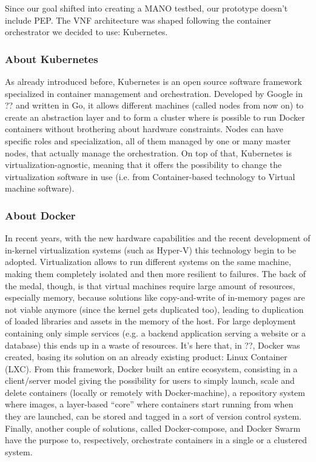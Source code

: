 \documentclass[10pt]{book}
\begin{document}
Since our goal shifted into creating a MANO testbed, our prototype doesn't
include PEP. The VNF architecture was shaped following the container
orchestrator we decided to use: Kubernetes.

\subsubsection{About Kubernetes}

As already introduced before, Kubernetes is an open source software framework
specialized in container management and orchestration. Developed by Google in
?? and written in Go, it allows different
machines (called nodes from now on) to create an abstraction layer and to form
a cluster where is possible to run Docker containers without brothering about
hardware constraints. Nodes can have specific roles and specialization, all of
them managed by one or many master nodes, that actually manage the
orchestration.
On top of that, Kubernetes is virtualization-agnostic, meaning that it offers
the possibility to change the virtualization software in use (i.e. from
Container-based technology to Virtual machine software).

\subsubsection{About Docker}

In recent years, with the new hardware capabilities and the recent development
of in-kernel virtualization systems (such as Hyper-V) this technology
begin to be adopted. Virtualization allows to run different systems on the
same machine, making them completely isolated and then more resilient to
failures. The back of the medal, though, is that virtual machines require large
amount of resources, especially memory, because solutions like copy-and-write
of in-memory pages are not viable anymore (since the kernel gets duplicated
too), leading to duplication of loaded libraries and assets in the memory of
the host.
For large deployment containing only simple services (e.g. a backend
application serving a website or a database) this ends up in a waste of
resources.  It's here that, in ??, Docker was
created, basing its solution on an already existing product: Linux Container
(LXC). From this framework, Docker built an entire ecosystem, consisting in a
client/server model giving the possibility for users to simply launch, scale and
delete containers (locally or remotely with Docker-machine), a repository
system where images, a layer-based ``core'' where containers start running from
when they are launched, can be stored and tagged in a sort of version control
system. Finally, another couple of solutions, called Docker-compose, and Docker
Swarm have the purpose to, respectively, orchestrate containers in a single or
a clustered system. 
\end{document}
